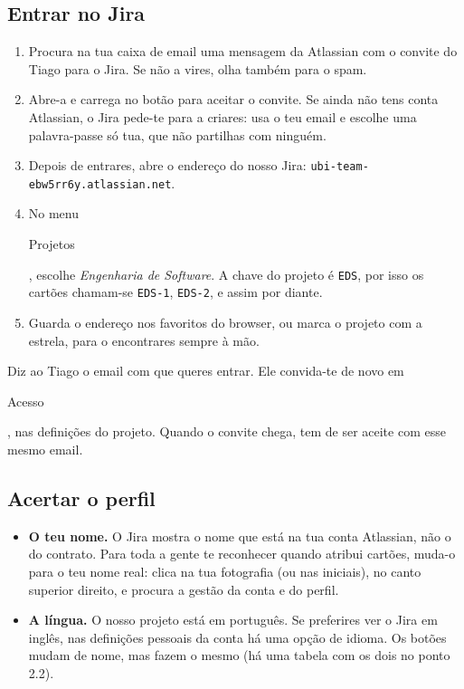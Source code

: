 \documentclass[11pt,a4paper]{article}
\newcommand{\btn}[1]{{\setlength{\fboxsep}{1.6pt}\colorbox{azulclaro}{\sffamily\small\strut #1}}}
\begin{document}
\subsection{Entrar no Jira}

\begin{enumerate}
  \item Procura na tua caixa de email uma mensagem da Atlassian com o convite do Tiago para o Jira. Se não a vires, olha também para o spam.
  \item Abre-a e carrega no botão para aceitar o convite. Se ainda não tens conta Atlassian, o Jira pede-te para a criares: usa o teu email e escolhe uma palavra-passe só tua, que não partilhas com ninguém.
  \item Depois de entrares, abre o endereço do nosso Jira: \texttt{ubi-team-ebw5rr6y.atlassian.net}.
  \item No menu \btn{Projetos}, escolhe \textit{Engenharia de Software}. A chave do projeto é \texttt{EDS}, por isso os cartões chamam-se \texttt{EDS-1}, \texttt{EDS-2}, e assim por diante.
  \item Guarda o endereço nos favoritos do browser, ou marca o projeto com a estrela, para o encontrares sempre à mão.
\end{enumerate}

\begin{tcolorbox}[atencao, title={Não recebeste o convite?}]
  Diz ao Tiago o email com que queres entrar. Ele convida-te de novo em \btn{Acesso}, nas definições do projeto. Quando o convite chega, tem de ser aceite com esse mesmo email.
\end{tcolorbox}

\subsection{Acertar o perfil}

\begin{itemize}
  \item \textbf{O teu nome.} O Jira mostra o nome que está na tua conta Atlassian, não o do contrato. Para toda a gente te reconhecer quando atribui cartões, muda-o para o teu nome real: clica na tua fotografia (ou nas iniciais), no canto superior direito, e procura a gestão da conta e do perfil.
  \item \textbf{A língua.} O nosso projeto está em português. Se preferires ver o Jira em inglês, nas definições pessoais da conta há uma opção de idioma. Os botões mudam de nome, mas fazem o mesmo (há uma tabela com os dois no ponto 2.2).
\end{itemize}
\end{document}

